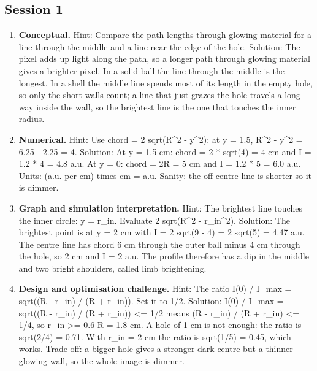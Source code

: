 \documentclass[11pt,a4paper]{article}
\begin{document}
\subsection*{Session 1}
\begin{enumerate}[nosep]
\item \textbf{Conceptual.} Hint: Compare the path lengths through glowing material for a line through the middle and a line near the edge of the hole. Solution: The pixel adds up light along the path, so a longer path through glowing material gives a brighter pixel. In a solid ball the line through the middle is the longest. In a shell the middle line spends most of its length in the empty hole, so only the short walls count; a line that just grazes the hole travels a long way inside the wall, so the brightest line is the one that touches the inner radius.
\item \textbf{Numerical.} Hint: Use chord = 2 sqrt(R\textasciicircum{}2 - y\textasciicircum{}2): at y = 1.5, R\textasciicircum{}2 - y\textasciicircum{}2 = 6.25 - 2.25 = 4. Solution: At y = 1.5 cm: chord = 2 * sqrt(4) = 4 cm and I = 1.2 * 4 = 4.8 a.u. At y = 0: chord = 2R = 5 cm and I = 1.2 * 5 = 6.0 a.u. Units: (a.u. per cm) times cm = a.u. Sanity: the off-centre line is shorter so it is dimmer.
\item \textbf{Graph and simulation interpretation.} Hint: The brightest line touches the inner circle: y = r\_in. Evaluate 2 sqrt(R\textasciicircum{}2 - r\_in\textasciicircum{}2). Solution: The brightest point is at y = 2 cm with I = 2 sqrt(9 - 4) = 2 sqrt(5) = 4.47 a.u. The centre line has chord 6 cm through the outer ball minus 4 cm through the hole, so 2 cm and I = 2 a.u. The profile therefore has a dip in the middle and two bright shoulders, called limb brightening.
\item \textbf{Design and optimisation challenge.} Hint: The ratio I(0) / I\_max = sqrt((R - r\_in) / (R + r\_in)). Set it to 1/2. Solution: I(0) / I\_max = sqrt((R - r\_in) / (R + r\_in)) \textless{}= 1/2 means (R - r\_in) / (R + r\_in) \textless{}= 1/4, so r\_in \textgreater{}= 0.6 R = 1.8 cm. A hole of 1 cm is not enough: the ratio is sqrt(2/4) = 0.71. With r\_in = 2 cm the ratio is sqrt(1/5) = 0.45, which works. Trade-off: a bigger hole gives a stronger dark centre but a thinner glowing wall, so the whole image is dimmer.
\end{enumerate}
\end{document}
